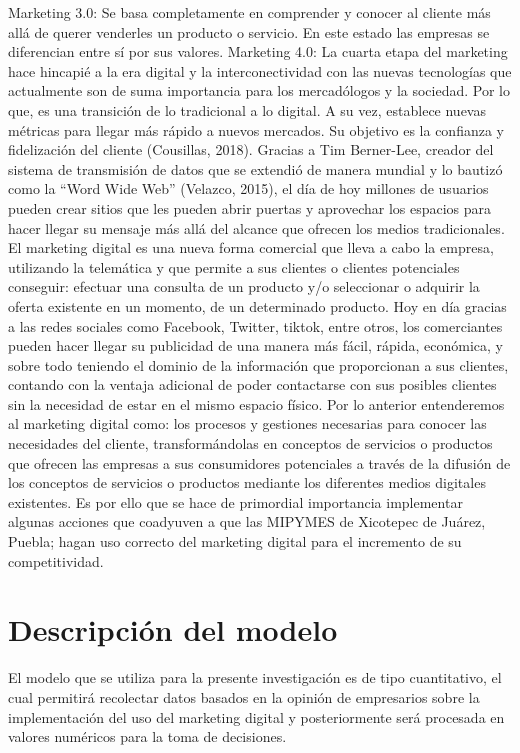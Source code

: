 \documentclass[12pt]{difu100cia} %
\begin{document}
Marketing 3.0: Se basa completamente en comprender y conocer al cliente más allá de querer venderles un producto o servicio. En este estado las empresas se diferencian entre sí por sus valores. 
Marketing 4.0: La cuarta etapa del marketing hace hincapié a la era digital y la interconectividad con las nuevas tecnologías que actualmente son de suma importancia para los mercadólogos y la sociedad. Por lo que, es una transición de lo tradicional a lo digital. A su vez, establece nuevas métricas para llegar más rápido a nuevos mercados. Su objetivo es la confianza y fidelización del cliente (Cousillas, 2018).
Gracias a Tim Berner-Lee, creador del sistema de transmisión de datos que se extendió de manera mundial y lo bautizó como la “Word Wide Web”  (Velazco, 2015), el día de hoy millones de usuarios pueden crear sitios que les pueden abrir puertas y aprovechar los espacios para hacer llegar su mensaje más allá del alcance que ofrecen los medios tradicionales. 
El marketing digital es una nueva forma comercial que lleva a cabo la empresa, utilizando la telemática y que permite a sus clientes o clientes potenciales conseguir: efectuar una consulta de un producto y/o seleccionar o adquirir la oferta existente en un momento, de un determinado producto. 
Hoy en día gracias a las redes sociales como Facebook, Twitter, tiktok, entre otros, los comerciantes pueden hacer llegar su publicidad de una manera más fácil, rápida, económica, y sobre todo teniendo el dominio de la información que proporcionan a sus clientes, contando con la ventaja adicional de poder contactarse con sus posibles clientes sin la necesidad de estar en el mismo espacio físico. 
Por lo anterior entenderemos al marketing digital como: los procesos y gestiones necesarias para conocer las necesidades del cliente, transformándolas en conceptos de servicios o productos que ofrecen las empresas a sus consumidores potenciales a través de la difusión de los conceptos de servicios o productos mediante los diferentes medios digitales existentes. Es por ello que se hace de primordial importancia implementar algunas acciones que coadyuven a que las MIPYMES de Xicotepec de Juárez, Puebla; hagan uso correcto del marketing digital para el incremento de su competitividad.

\section{Descripción del modelo}
El modelo que se utiliza para la presente investigación es de tipo cuantitativo, el cual permitirá recolectar datos basados en la opinión de empresarios sobre la implementación del uso del marketing digital y posteriormente será procesada en valores numéricos para la toma de decisiones. 
\end{document}
